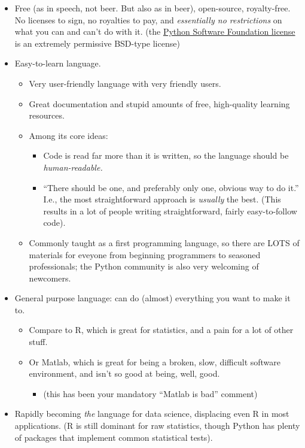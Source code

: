 \documentclass[11pt]{article}
\providecommand{\tightlist}{%
      \setlength{\itemsep}{0pt}\setlength{\parskip}{0pt}}
\begin{document}
\begin{itemize}
\item
  Free (as in speech, not beer. But also as in beer), open-source,
  royalty-free. No licenses to sign, no royalties to pay, and
  \emph{essentially no restrictions} on what you can and can't do with
  it. (the \href{https://docs.python.org/3/license.html}{Python Software
  Foundation license} is an extremely permissive BSD-type license)
\item
  Easy-to-learn language.

  \begin{itemize}
  \tightlist
  \item
    Very user-friendly language with very friendly users.
  \item
    Great documentation and stupid amounts of free, high-quality
    learning resources.
  \item
    Among its core ideas:

    \begin{itemize}
    \tightlist
    \item
      Code is read far more than it is written, so the language should
      be \emph{human-readable.}
    \item
      ``There should be one, and preferably only one, obvious way to do
      it.'' I.e., the most straightforward approach is \emph{usually}
      the best. (This results in a lot of people writing
      straightforward, fairly easy-to-follow code).
    \end{itemize}
  \item
    Commonly taught as a first programming language, so there are LOTS
    of materials for eveyone from beginning programmers to seasoned
    professionals; the Python community is also very welcoming of
    newcomers.
  \end{itemize}
\item
  General purpose language: can do (almost) everything you want to make
  it to.

  \begin{itemize}
  \tightlist
  \item
    Compare to R, which is great for statistics, and a pain for a lot of
    other stuff.
  \item
    Or Matlab, which is great for being a broken, slow, difficult
    software environment, and isn't so good at being, well, good.

    \begin{itemize}
    \tightlist
    \item
      (this has been your mandatory ``Matlab is bad'' comment)
    \end{itemize}
  \end{itemize}
\item
  Rapidly becoming \emph{the} language for data science, displacing even
  R in most applications. (R is still dominant for raw statistics,
  though Python has plenty of packages that implement common statistical
  tests).


\end{itemize}
\end{document}
